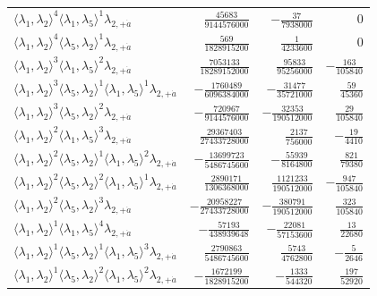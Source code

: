 \begin{longtable}{@{}lrrr@{}}
$\langle\lambda_1,\lambda_2\rangle^{4}\langle\lambda_1,\lambda_5\rangle^{1}\lambda_{2,+\dot a}$ & $\frac{45683}{9144576000}$ & $-\frac{37}{7938000}$ & $0$ \\
$\langle\lambda_1,\lambda_2\rangle^{4}\langle\lambda_5,\lambda_2\rangle^{1}\lambda_{2,+\dot a}$ & $\frac{569}{1828915200}$ & $\frac{1}{4233600}$ & $0$ \\
$\langle\lambda_1,\lambda_2\rangle^{3}\langle\lambda_1,\lambda_5\rangle^{2}\lambda_{2,+\dot a}$ & $\frac{7053133}{18289152000}$ & $\frac{95833}{95256000}$ & $-\frac{163}{105840}$ \\
$\langle\lambda_1,\lambda_2\rangle^{3}\langle\lambda_5,\lambda_2\rangle^{1}\langle\lambda_1,\lambda_5\rangle^{1}\lambda_{2,+\dot a}$ & $-\frac{1760489}{6096384000}$ & $-\frac{31477}{35721000}$ & $\frac{59}{45360}$ \\
$\langle\lambda_1,\lambda_2\rangle^{3}\langle\lambda_5,\lambda_2\rangle^{2}\lambda_{2,+\dot a}$ & $-\frac{720967}{9144576000}$ & $-\frac{32353}{190512000}$ & $\frac{29}{105840}$ \\
$\langle\lambda_1,\lambda_2\rangle^{2}\langle\lambda_1,\lambda_5\rangle^{3}\lambda_{2,+\dot a}$ & $\frac{29367403}{27433728000}$ & $\frac{2137}{756000}$ & $-\frac{19}{4410}$ \\
$\langle\lambda_1,\lambda_2\rangle^{2}\langle\lambda_5,\lambda_2\rangle^{1}\langle\lambda_1,\lambda_5\rangle^{2}\lambda_{2,+\dot a}$ & $-\frac{13699723}{5486745600}$ & $-\frac{55939}{8164800}$ & $\frac{821}{79380}$ \\
$\langle\lambda_1,\lambda_2\rangle^{2}\langle\lambda_5,\lambda_2\rangle^{2}\langle\lambda_1,\lambda_5\rangle^{1}\lambda_{2,+\dot a}$ & $\frac{2890171}{1306368000}$ & $\frac{1121233}{190512000}$ & $-\frac{947}{105840}$ \\
$\langle\lambda_1,\lambda_2\rangle^{2}\langle\lambda_5,\lambda_2\rangle^{3}\lambda_{2,+\dot a}$ & $-\frac{20958227}{27433728000}$ & $-\frac{380791}{190512000}$ & $\frac{323}{105840}$ \\
$\langle\lambda_1,\lambda_2\rangle^{1}\langle\lambda_1,\lambda_5\rangle^{4}\lambda_{2,+\dot a}$ & $-\frac{57193}{438939648}$ & $-\frac{22081}{57153600}$ & $\frac{13}{22680}$ \\
$\langle\lambda_1,\lambda_2\rangle^{1}\langle\lambda_5,\lambda_2\rangle^{1}\langle\lambda_1,\lambda_5\rangle^{3}\lambda_{2,+\dot a}$ & $\frac{2790863}{5486745600}$ & $\frac{5743}{4762800}$ & $-\frac{5}{2646}$ \\
$\langle\lambda_1,\lambda_2\rangle^{1}\langle\lambda_5,\lambda_2\rangle^{2}\langle\lambda_1,\lambda_5\rangle^{2}\lambda_{2,+\dot a}$ & $-\frac{1672199}{1828915200}$ & $-\frac{1333}{544320}$ & $\frac{197}{52920}$ \\

\end{longtable}
